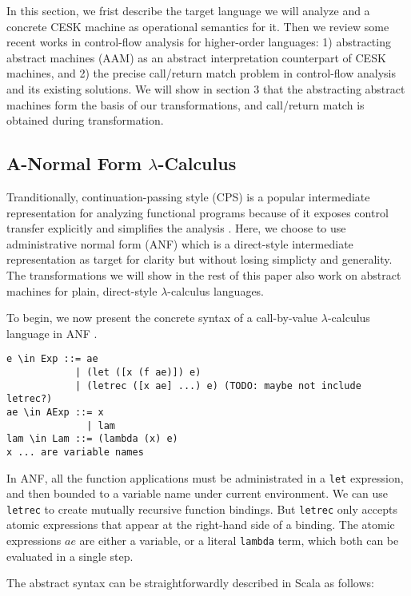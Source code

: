 \documentclass[acmsmall,review,anonymous]{acmart}\settopmatter{printfolios=true,printccs=false,printacmref=false}
\begin{document}
In this section, we frist describe the target language we will
analyze and a concrete CESK machine as operational semantics for it.
Then we review some recent works in control-flow analysis for
higher-order languages:
1) abstracting abstract machines (AAM) as an abstract interpretation
counterpart of CESK machines, and
2) the precise call/return match problem in control-flow analysis and its existing solutions.
We will show in section 3 that the abstracting abstract machines form the basis of our transformations,
and call/return match is obtained during transformation.

\subsection{A-Normal Form $\lambda$-Calculus} \label{anfsyntax}

Tranditionally, continuation-passing style (CPS) is a popular intermediate representation
for analyzing functional programs because of it exposes control transfer explicitly
and simplifies the analysis \cite{Shivers:1991:SSC:115865.115884, Shivers:1988:CFA:53990.54007}.
Here, we choose to use administrative normal form (ANF) which is a direct-style intermediate representation 
as target for clarity but without losing simplicty and generality.
The transformations we will show in the rest of this paper
also work on abstract machines for plain, direct-style $\lambda$-calculus languages.

To begin, we now present the concrete syntax of a call-by-value $\lambda$-calculus language 
in ANF \cite{flanagan1993essence}.

\begin{verbatim}
e \in Exp ::= ae
            | (let ([x (f ae)]) e)
            | (letrec ([x ae] ...) e) (TODO: maybe not include letrec?)
ae \in AExp ::= x
              | lam
lam \in Lam ::= (lambda (x) e)
x ... are variable names
\end{verbatim}

In ANF, all the function applications must be administrated in a \texttt{let} expression,
and then bounded to a variable name under current environment.
We can use \texttt{letrec} to create mutually recursive function bindings. But \texttt{letrec}
only accepts atomic expressions that appear at the right-hand side of a binding.
The atomic expressions $ae$ are either a variable, or a literal \texttt{lambda} term, which
both can be evaluated in a single step.

The abstract syntax can be straightforwardly described in Scala as follows:
\end{document}
